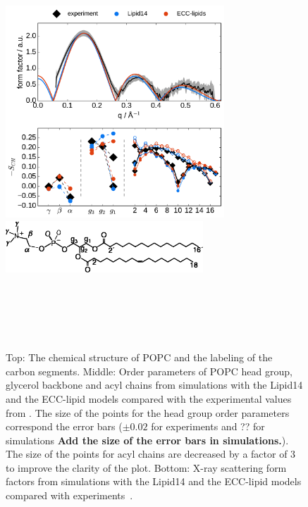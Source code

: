 \documentclass[aip,jcp,twocolumn]{revtex4}
\begin{document}
\begin{figure}[tbp]
  \centering
  \includegraphics[width=8.2cm]{../Fig/ipython_nb/Order-parameters_form-factors_exp-L14-ECCL17_q80_sig89.pdf}
  \includegraphics[width=7.4cm]{../Fig/POPCstructure.eps}
  \caption{\label{simVSexpNOions}
    Top: The chemical structure of POPC and the labeling of the carbon segments.
    Middle: Order parameters of POPC head group, glycerol backbone and acyl chains 
    from simulations with the Lipid14 \cite{dickson14} and the ECC-lipid models
    compared with the experimental values from \cite{ferreira13}.
    The size of the points for the head group order parameters correspond 
    the error bars ($\pm 0.02$ for experiments \cite{botan15,ollila16} and ?? for
    simulations {\bf Add the size of the error bars in simulations.}).
    The size of the points for acyl chains are decreased by a factor of 3 to improve the clarity of the plot.
    Bottom: X-ray scattering form factors from simulations with the Lipid14 \cite{dickson14} and
    the ECC-lipid models compared with experiments~\cite{Kucerka2011}.
  } 
   \\
   \\
   \\
   \\
\end{figure}
\end{document}
